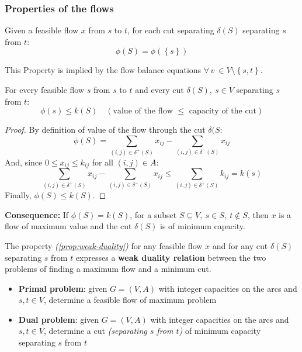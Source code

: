\documentclass[english]{article}
\begin{document}
\subsubsection{Properties of the flows}
\begin{property}
  Given a feasible flow \(x\) from \(s\) to \(t\), for each cut separating \(\delta(S)\) separating \(s\) from \(t\):
  \[ \phi(S) = \phi\left( \left\{ s \right\} \right) \]

  This Property is implied by the flow balance equations \(\forall \, v \ \in V \setminus \left\{ s, t \right\}\).
\end{property}

\bigskip
\begin{property}
  For every feasible flow \(s\) from \(s\) to \(t\) and every cut \(\delta(S), \ s \in V\) separating \(s\) from \(t\):
  \[ \phi(s) \leq k(S) \quad \left( \text{value of the flow } \leq \text{ capacity of the cut} \right)\]
  \label{prop:weak-duality}
\end{property}
\begin{proof}
  By definition of value of the flow through the cut \(\delta(S\):
  \[ \phi(S) = \displaystyle \sum_{\left( i, j \right) \in \delta^+(S)} x_{ij} - \sum_{\left( i, j \right) \in \delta^-(S)} x_{ij} \]
  And, since \(0 \leq x_{ij} \leq k_{ij}\) for all \(\left( i, j \right) \in A\):
  \[ \displaystyle \sum_{\left( i, j \right) \in \delta^+(S)} x_{ij} - \sum_{\left( i, j \right) \in \delta^-(S)} x_{ij} \leq \displaystyle \sum_{\left( i, j \right) \in \delta^+(S)} k_{ij} = k(s) \]
  Finally, \(\phi(S) \leq k(S)\).
\end{proof}

\textbf{Consequence:}
If \(\phi(S) = k(S)\), for a subset \(S \subseteq V, \ s \in S, \ t \notin S\), then \(x\) is a flow of maximum value and the cut \(\delta(S)\) is of minimum capacity.

The property \textit{(\ref{prop:weak-duality})} for any feasible flow \(x\) and for any cut \(\delta(S)\) separating \(s\) from \(t\) expresses a \textbf{weak duality relation} between the two problems of finding a maximum flow and a minimum cut.

\begin{itemize}
  \item \textbf{Primal problem}: given \(G = (V, A)\) with integer capacities on the arcs and \(s, t \in V\), determine a feasible flow of maximum problem
  \item \textbf{Dual problem}: given \(G = (V, A)\) with integer capacities on the arcs and \(s, t \in V\), determine a cut \textit{(separating \(s\) from \(t\))} of minimum capacity separating \(s\) from \(t\)
\end{itemize}
\end{document}
